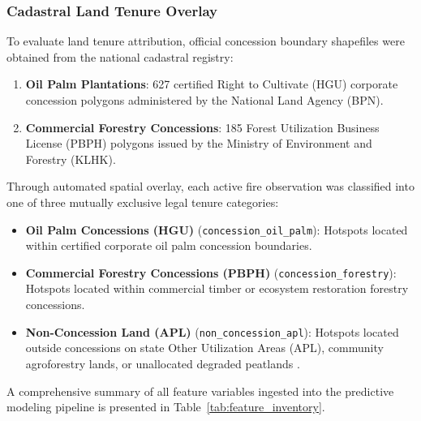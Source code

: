 \subsubsection{Cadastral Land Tenure Overlay}
\label{subsubsec:tenure_overlay}

To evaluate land tenure attribution, official concession boundary shapefiles were obtained from the national cadastral registry:
\begin{enumerate}
    \item \textbf{Oil Palm Plantations}: 627 certified Right to Cultivate (HGU) corporate concession polygons administered by the National Land Agency (BPN).
    \item \textbf{Commercial Forestry Concessions}: 185 Forest Utilization Business License (PBPH) polygons issued by the Ministry of Environment and Forestry (KLHK).
\end{enumerate}

Through automated spatial overlay, each active fire observation was classified into one of three mutually exclusive legal tenure categories:
\begin{itemize}
    \item \textbf{Oil Palm Concessions (HGU)} (\texttt{concession\_oil\_palm}): Hotspots located within certified corporate oil palm concession boundaries.
    \item \textbf{Commercial Forestry Concessions (PBPH)} (\texttt{concession\_forestry}): Hotspots located within commercial timber or ecosystem restoration forestry concessions.
    \item \textbf{Non-Concession Land (APL)} (\texttt{non\_concession\_apl}): Hotspots located outside concessions on state Other Utilization Areas (APL), community agroforestry lands, or unallocated degraded peatlands \citep{Putranto2023LandUsePol}.
\end{itemize}

A comprehensive summary of all feature variables ingested into the predictive modeling pipeline is presented in Table~\ref{tab:feature_inventory}.

